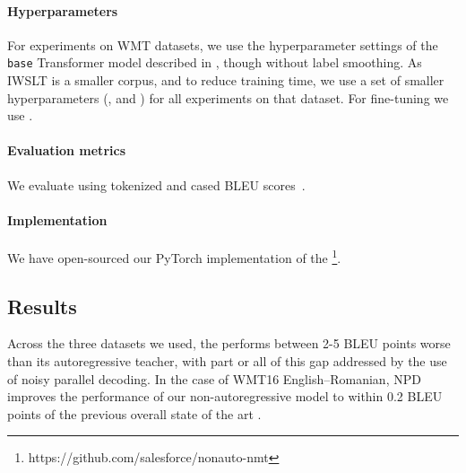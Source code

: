 \documentclass{article} \usepackage{iclr2018_conference,times}
\begin{document}
\vspace{-5pt}
\paragraph{Hyperparameters}
For experiments on WMT datasets, we use the hyperparameter settings of the \texttt{base} Transformer model described in \citet{vaswani2017attention}, though without label smoothing. As IWSLT is a smaller corpus, and to reduce training time, we use a set of smaller hyperparameters (, and ) for all experiments on that dataset.
For fine-tuning we use .

\vspace{-5pt}
\paragraph{Evaluation metrics} We evaluate using tokenized and cased BLEU scores~\citep{papineni2002bleu}.

\vspace{-5pt}
\paragraph{Implementation} We have open-sourced our PyTorch implementation of the \model{}\footnote{https://github.com/salesforce/nonauto-nmt}.

\subsection{Results}
Across the three datasets we used, the \model{} performs between 2-5 BLEU points worse than its autoregressive teacher, with part or all of this gap addressed by the use of noisy parallel decoding. In the case of WMT16 English--Romanian, NPD improves the performance of our non-autoregressive model to within 0.2 BLEU points of the previous overall state of the art \citep{gehring2017convolutional}.
\end{document}
